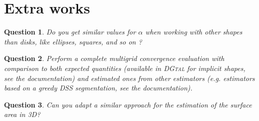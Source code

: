 \documentclass[a4paper, 11pt]{article}
\newtheorem{qu}{Question}
\begin{document}
\section{Extra works}

\begin{qu}
Do you get similar values for $\alpha$ when working with other shapes than disks, like ellipses, squares, and so on ?
\end{qu}

\begin{qu}
  Perform a complete multigrid convergence evaluation with comparison
  to both expected quantities (available in \textsc{DGtal} for
  implicit shapes, see the documentation) and estimated ones from other
  estimators (e.g. estimators based on a greedy DSS segmentation, see the 
 documentation).
\end{qu}

\begin{qu}
Can you adapt a similar approach for the estimation of the surface area in 3D?
\end{qu}
\end{document}
